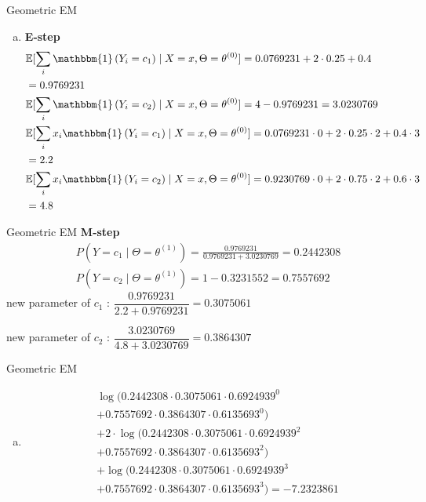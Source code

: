 \documentclass{beamer}\usepackage[]{graphicx}\usepackage[]{color}
\newcommand{\id}[1]{\mathbbm{1}\left(#1\right)}
\begin{document}
\begin{frame}{Geometric EM}
\small
\begin{enumerate}[c)]
\item \textbf{E-step}\begin{align*}
&\mathbb{E}[\sum_{i}\id{Y_{i}=c_{1}}\mid X=x, \Theta=\theta^{(0)}] = 0.0769231 + 
2\cdot 0.25 + 0.4 \\
&= 0.9769231 \\
&\mathbb{E}[\sum_{i}\id{Y_{i}=c_{2}}\mid X=x, \Theta=\theta^{(0)}] = 4 - 0.9769231 = 3.0230769 \\
&\mathbb{E}[\sum_{i}x_{i}\id{Y_{i}=c_{1}}\mid X=x, \Theta=\theta^{(0)}] = 0.0769231 \cdot 0 + 
2\cdot 0.25 \cdot 2 + 0.4 \cdot 3\\
&= 2.2 \\
&\mathbb{E}[\sum_{i}x_{i}\id{Y_{i}=c_{2}}\mid X=x, \Theta=\theta^{(0)}] = 0.9230769 \cdot 0 + 
2\cdot 0.75 \cdot 2 + 0.6 \cdot 3\\
&= 4.8
\end{align*}
\end{enumerate}
\end{frame}



\begin{frame}{Geometric EM}
\textbf{M-step}
\begin{align*}
&P(Y=c_{1}\mid \Theta = \theta^{(1)}) = \frac{0.9769231}{0.9769231 + 3.0230769} = 0.2442308 \\
&P(Y=c_{2}\mid \Theta = \theta^{(1)}) = 1 - 0.3231552
= 0.7557692 
\end{align*}
new parameter of $ c_{1} $ : $ \dfrac{0.9769231}{2.2 + 0.9769231} = 0.3075061 $\vspace{.5cm}

new parameter of $ c_{2} $ : $ \dfrac{3.0230769}{4.8 + 3.0230769} = 0.3864307 $
\end{frame}

\begin{frame}{Geometric EM}
\begin{enumerate}[d)]
\item \begin{align*}
&\log(0.2442308\cdot 0.3075061\cdot 0.6924939^{0}  \\
&+ 0.7557692 \cdot 0.3864307 \cdot 0.6135693^{0}) \\
&+ 2\cdot \log(0.2442308\cdot 0.3075061 \cdot 0.6924939^{2} \\
&+ 0.7557692\cdot 0.3864307 \cdot 0.6135693^{2}) \\
&+ \log(0.2442308\cdot 0.3075061 \cdot 0.6924939^{3} \\
&+ 0.7557692\cdot 0.3864307 \cdot 0.6135693^{3})
= \ensuremath{-7.2323861} 
\end{align*}
\end{enumerate}
\end{frame}
\end{document}
